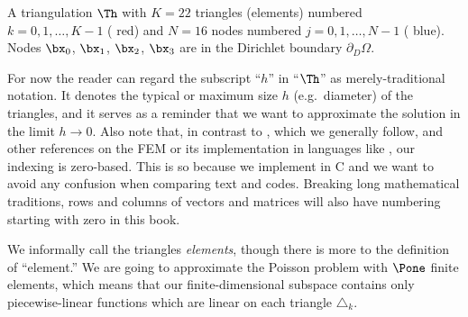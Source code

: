 \begin{marginfigure}

\caption{A triangulation $\Th$ with $K=22$ triangles (elements) numbered $k=0,1,\dots,K-1$ ({\color{red} red}) and $N=16$ nodes numbered $j=0,1,\dots,N-1$  ({\color{blue} blue}).  Nodes $\bx_0$, $\bx_1$, $\bx_2$, $\bx_3$ are in the Dirichlet boundary $\partial_D\Omega$.}
\label{fig:number-elements}
\end{marginfigure}

For now the reader can regard the subscript ``$h$'' in ``$\Th$'' as merely-traditional notation.  It denotes the typical or maximum size $h$ (e.g.~diameter) of the triangles, and it serves as a reminder that we want to approximate the solution in the limit $h\to 0$.  Also note that, in contrast to \citet{Elmanetal2005}, which we generally follow, and other references on the FEM or its implementation in languages like \Matlab, our indexing is zero-based.  This is so because we implement in C and we want to avoid any confusion when comparing text and codes.  Breaking long mathematical traditions, rows and columns of vectors and matrices will also have numbering starting with zero in this book.

We informally call the triangles \emph{elements}, though there is more to the definition of ``element.''  We are going to approximate the Poisson problem with $\Pone$ finite elements, which means that our finite-dimensional subspace contains only piecewise-linear functions which are linear on each triangle $\triangle_k$.

